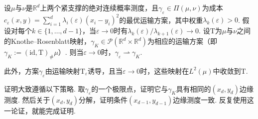 \begin{theorem}\label{obj:2.23}
设$\mu$与$\nu$是$\mathbb R^d$上两个紧支撑的绝对连续概率测度，且$\gamma_\varepsilon\in\Pi(\mu,\nu)$为成本
$c_\varepsilon(x,y)=\sum_{i=1}^d\lambda_i(\varepsilon)(x_i-y_i)^2$的最优运输方案，其中权重$\lambda_k(\varepsilon)>0$. 假设对每个$k\in\{1,\ldots,d-1\}$，当$\varepsilon\to0$时有$\lambda_k(\varepsilon)/\lambda_{k+1}(\varepsilon)\to0$. 设$\mathrm T$为$\mu$与$\nu$之间的Knothe--Rosenblatt映射，$\gamma_K\in\mathscr P(\mathbb R^d\times\mathbb R^d)$为相应的运输方案（即$\gamma_K:=(\mathrm{id},\mathrm T)_\#\mu$）. 则当$\varepsilon\to0$时，$\gamma_\varepsilon\rightharpoonup\gamma_K$.

此外，方案$\gamma_\varepsilon$由运输映射$\mathrm T_\varepsilon$诱导，且当$\varepsilon\to0$时，这些映射在$L^2(\mu)$中收敛到$\mathrm T$.
\end{theorem}

证明大致遵循以下策略. 取$\gamma_\varepsilon$的一个极限点，证明它与$\gamma_K$具有相同的$(x_d,y_d)$边缘测度. 然后关于$(x_d,y_d)$分解，证明条件$(x_{d-1},y_{d-1})$边缘测度一致. 反复使用这一论证，就能完成证明.


